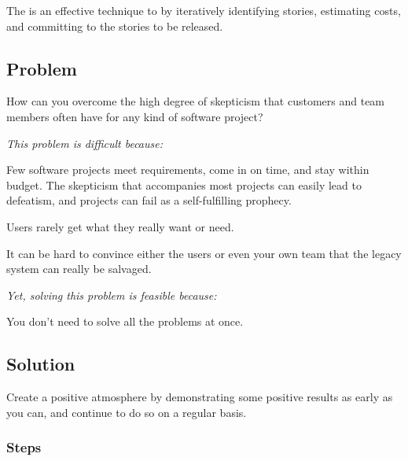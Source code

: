 \documentclass[a4paper,10pt,twoside]{book}
\begin{document}
The  \cite{Beck01a} is an effective technique to  by iteratively identifying stories, estimating costs, and committing to the stories to be released.




\subsection*{Problem}

How can you overcome the high degree of skepticism that customers and team members often have for any kind of software project?

\emph{This problem is difficult because:} 

\begin{bulletlist}
\item Few software projects meet requirements, come in on time, and stay within budget. The skepticism that accompanies most projects can easily lead to defeatism, and projects can fail as a self-fulfilling prophecy.

\item Users rarely get what they really want or need.

\item It can be hard to convince either the users or even your own team that the legacy system can really be salvaged.
\end{bulletlist}

\emph{Yet, solving this problem is feasible because:}

\begin{bulletlist}
\item You don't need to solve all the problems at once.
\end{bulletlist}

\subsection*{Solution}

Create a positive atmosphere by demonstrating some positive results as early as you can, and continue to do so on a regular basis.

\subsubsection*{Steps}
\end{document}
